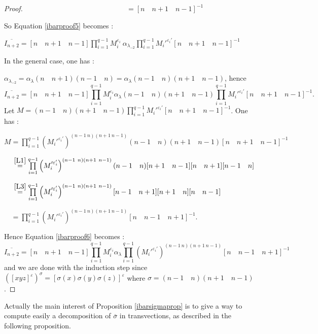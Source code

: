 \documentclass[a4paper,12pt,fleqn]{article}
\renewcommand\epsilon{\varepsilon}
\begin{document}
\begin{proof}
    $\phantom{[n-1\quad n\quad n+1](n\quad n+1)}=[n\quad n+1\quad n-1]^{-1}$

    So Equation \eqref{ibarproof5} becomes :

$\overline{I_{n+2}}=[n\quad n+1\quad n-1]\prod\limits_{i=1}^{q-1}M_i^{\varepsilon_i}\ \alpha_{\lambda_{-2}}
    \prod\limits_{i=1}^{q-1}M_i'^{\varepsilon_i'}[n\quad n+1\quad n-1]^{-1}$

    In the general case, one has :

    $\alpha_{\lambda_{-2}}=\alpha_{\lambda}(n\quad n+1)(n-1\quad n)=\alpha_{\lambda}(n-1\quad n)(n+1\quad n-1)$, hence
\begin{equation}\label{ibarproof6}
\overline{I_{n+2}}=[n\quad n+1\quad n-1]\prod\limits_{i=1}^{q-1}M_i^{\varepsilon_i}\alpha_{\lambda}(n-1\quad n)(n+1\quad n-1)
\prod\limits_{i=1}^{q-1}M_i'^{\varepsilon_i'}[n\quad n+1\quad n-1]^{-1}.
\end{equation}
Let $M=(n-1\quad n)(n+1\quad n-1)
\prod\limits_{i=1}^{q-1}M_i'^{\varepsilon_i'}[n\quad n+1\quad n-1]^{-1}$. One has :

$M=\prod\limits_{i=1}^{q-1}\left(M_i'^{\varepsilon_i'}\right)^{(n-1\ n)(n+1\ n-1)}(n-1\quad n)(n+1\quad n-1)[n\quad n+1\quad n-1]^{-1}$

        $\phantom{M}\stackrel{\ref{L1}}{=}\prod\limits_{i=1}^{q-1}\left(M_i'^{\varepsilon_i'}\right)^{(n-1\ n)(n+1\ n-1)}(n-1\quad n)[n+1\quad n-1][n\quad n+1][n-1\quad n]$

        $\phantom{M}\stackrel{\ref{L3}}{=}\prod\limits_{i=1}^{q-1}\left(M_i'^{\varepsilon_i'}\right)^{(n-1\ n)(n+1\ n-1)}[n-1\quad n+1][n+1\quad n][n\quad n-1]$

        $\phantom{M}=\prod\limits_{i=1}^{q-1}\left(M_i'^{\varepsilon_i'}\right)^{(n-1\  n)(n+1\ n-1)}[n\quad n-1\quad n+1]^{-1}$.

        Hence Equation \eqref{ibarproof6} becomes :
        \begin{equation*}
        \overline{I_{n+2}}=[n\quad n+1\quad n-1]\prod\limits_{i=1}^{q-1}M_i^{\varepsilon_i}\alpha_{\lambda}
        \prod\limits_{i=1}^{q-1}\left(M_i'^{\varepsilon_i'}\right)^{(n-1\  n)(n+1\ n-1)}[n\quad n-1\quad n+1]^{-1}
      \end{equation*}
      and we are done with the induction step since $([xyz]^{\epsilon})^{\sigma}=[\sigma(x)\sigma(y)\sigma(z)]^{\epsilon}$ where $\sigma=(n-1\quad n)(n+1\quad n-1)$.

\end{proof}

Actually the main interest of Proposition \ref{ibarsigmaprop} is to give a way to compute easily a decomposition of $\overline{\sigma}$ in transvections,
as described in
the following proposition.
\end{document}
